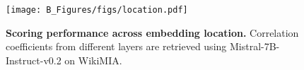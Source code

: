 
\begin{figure}[t]
    \begin{center}
    \vspace{3mm}
    \texttt{[image: B\_Figures/figs/location.pdf]}
    \end{center}
    \vspace{-4mm}
    \caption{\textbf{Scoring performance across embedding location.} Correlation coefficients from different layers are retrieved using Mistral-7B-Instruct-v0.2 on WikiMIA.}
\label{fig:location}
\end{figure}
